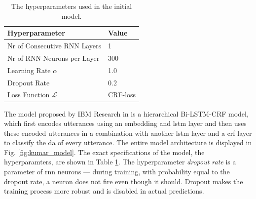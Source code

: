     \begin{table}
    \centering
        \begin{tabular}{|l|l|}
        \hline
        \textbf{Hyperparameter}      & \textbf{Value} \\ \hline
        Nr of Consecutive RNN Layers & 1              \\ \hline
        Nr of RNN Neurons per Layer  & 300            \\ \hline
        Learning Rate $\alpha$       & 1.0            \\ \hline
        Dropout Rate                 & 0.2            \\ \hline
        Loss Function $\mathcal{L}$  & CRF-loss\cite{originalCRF} \\ \hline
        \end{tabular}
        \caption{\label{table: da hyperparams} The hyperparameters used in the initial model. }
    \end{table}
    The \gls{model} proposed by IBM Research in \cite{kumar2017dialogue} is a hierarchical Bi-LSTM-CRF \gls{model}, which first encodes \glspl{utterance} using an \gls{embedding} and \gls{lstm} layer and then uses these encoded \glspl{utterance} in a combination with another \gls{lstm} layer and a \gls{crf} layer to classify the \gls{da} of every \gls{utterance}. The entire \gls{model} architecture is displayed in Fig. \ref{fig:kumar_model}. The exact specifications of the model, the hyperparamters, are shown in Table \ref{table: da hyperparams}. The hyperparameter \textit{dropout rate} is a parameter of \gls{rnn} \glspl{neuron} --- during training, with probability equal to the dropout rate, a \gls{neuron} does not fire even though it should. Dropout makes the training process more robust and is disabled in actual predictions\cite{mlTextbook}.

